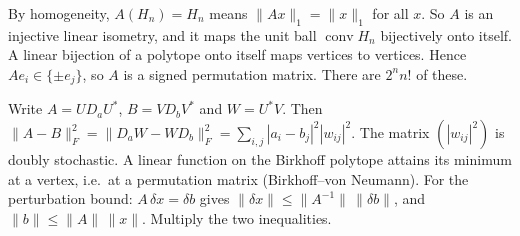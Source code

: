 \documentclass[11pt,a4paper]{article}
\begin{document}
By homogeneity, \(A(H_n)=H_n\) means \(\|Ax\|_1=\|x\|_1\) for all \(x\). So \(A\) is an injective linear isometry, and it maps the unit ball \(\operatorname{conv}H_n\) bijectively onto itself.
A linear bijection of a polytope onto itself maps vertices to vertices. Hence \(Ae_i\in\{\pm e_j\}\), so \(A\) is a signed permutation matrix. There are \(2^nn!\) of these.

Write \(A=UD_aU^*\), \(B=VD_bV^*\) and \(W=U^*V\). Then \(\|A-B\|_F^2=\|D_aW-WD_b\|_F^2=\sum_{i,j}|a_i-b_j|^2|w_{ij}|^2\).
The matrix \((|w_{ij}|^2)\) is doubly stochastic. A linear function on the Birkhoff polytope attains its minimum at a vertex, i.e.\ at a permutation matrix (Birkhoff--von Neumann).
For the perturbation bound: \(A\,\delta x=\delta b\) gives \(\|\delta x\|\le\|A^{-1}\|\,\|\delta b\|\), and \(\|b\|\le\|A\|\,\|x\|\). Multiply the two inequalities.
\end{document}
